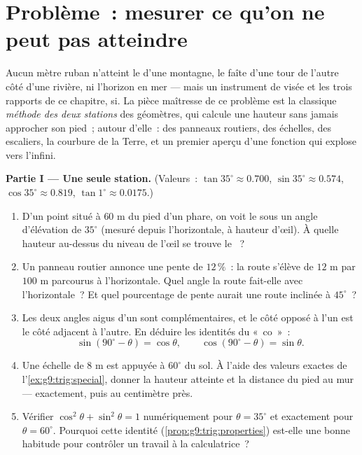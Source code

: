 \section{Problème~: mesurer ce qu'on ne peut pas atteindre}

\begin{problem}
\label{pb:g9:trig:1}
Aucun mètre ruban n'atteint le  d'une montagne, le faîte d'une
tour de l'autre côté d'une rivière, ni l'horizon en mer --- mais un
instrument de visée et les trois rapports de ce chapitre, si. La
pièce maîtresse de ce problème est la classique \emph{méthode des
deux stations} des géomètres, qui calcule une hauteur sans jamais
approcher son pied~; autour d'elle~: des panneaux routiers, des
échelles, des escaliers, la courbure de la Terre, et un premier
aperçu d'une fonction qui explose vers l'infini.

\medskip
\noindent\textbf{Partie I --- Une seule station.}
(Valeurs~: $\tan 35^\circ \approx 0.700$,
$\sin 35^\circ \approx 0.574$, $\cos 35^\circ \approx 0.819$,
$\tan 1^\circ \approx 0.0175$.)
\begin{enumerate}
  \item D'un point situé à $60$ m du pied d'un phare, on voit le
         sous un angle d'élévation de $35^\circ$ (mesuré
        depuis l'horizontale, à hauteur d'œil). À quelle hauteur
        au-dessus du niveau de l'œil se trouve le ~?
  \item Un panneau routier annonce une pente de $12\,\%$~: la route
        s'élève de $12$ m par $100$ m parcourus à l'horizontale.
        Quel angle la route fait-elle avec l'horizontale~? Et quel
        pourcentage de pente aurait une route inclinée à
        $45^\circ$~?
  \item Les deux angles aigus d'un  sont
        complémentaires, et le côté opposé à l'un est le côté
        adjacent à l'autre. En déduire les identités du «~co~»~:
        \[
        \sin(90^\circ - \theta) = \cos\theta,
        \qquad
        \cos(90^\circ - \theta) = \sin\theta .
        \]
  \item Une échelle de $8$ m est appuyée à $60^\circ$ du sol. À
        l'aide des valeurs exactes de l'\cref{ex:g9:trig:special},
        donner la hauteur atteinte et la distance du pied au mur ---
        exactement, puis au centimètre près.
  \item Vérifier $\cos^2\theta + \sin^2\theta = 1$ numériquement
        pour $\theta = 35^\circ$ et exactement pour
        $\theta = 60^\circ$. Pourquoi cette identité
        (\cref{prop:g9:trig:properties}) est-elle une bonne habitude
        pour contrôler un travail à la calculatrice~?
\end{enumerate}


\end{problem}
